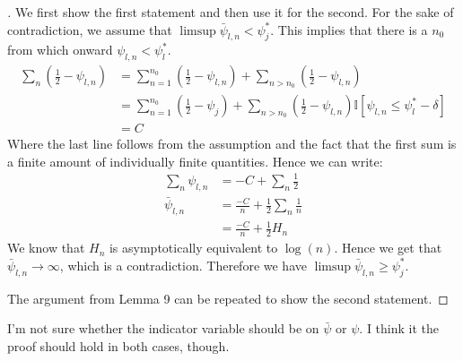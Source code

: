 \begin{proof}[]
    We first show the first statement and then use it for the second. For the
    sake of contradiction, we assume that $\limsup \bar{\psi}_{l, n} <
    \psi_j^*$. This implies that there is a $n_0$ from which onward $\psi_{l,
    n} < \psi_l^*$.
    \begin{align}
      \sum_n (\frac{1}{2} - \psi_{l, n}) &= \sum_{n=1}^{n_0} (\frac{1}{2} -
          \psi_{l, n}) + \sum_{n > n_0} (\frac{1}{2} - \psi_{l, n}) \\
        &= \sum_{n=1}^{n_0} (\frac{1}{2} - \psi_j) + \sum_{n > n_0}
            (\frac{1}{2} - \psi_{l, n})\mathbb{I}[\psi_{l, n} \leq \psi_l^* -
            \delta] \\
        &= C
    \end{align}
    Where the last line follows from the assumption and the fact that the first
    sum is a finite amount of individually finite quantities. Hence we can
    write:
    \begin{align}
      \sum_n \psi_{l, n} &= -C + \sum_n \frac{1}{2} \\
      \bar{\psi}_{l, n} &= \frac{-C}{n} + \frac{1}{2}\sum_n\frac{1}{n} \\
        &= \frac{-C}{n} + \frac{1}{2} H_n
    \end{align}
    We know that $H_n$ is asymptotically equivalent to $\log(n)$. Hence we get
    that $\bar{\psi}_{l, n} \rightarrow \infty$, which is a contradiction.
    Therefore we have $\limsup \bar{\psi}_{l, n} \geq \psi_j^*$.

    The argument from Lemma 9 can be repeated to show the second statement.
  \end{proof}

  \begin{remark}[Kevin 19/10/29]
    I'm not sure whether the indicator variable should be on $\bar{\psi}$ or
    $\psi$. I think it the proof should hold in both cases, though.
  \end{remark}

